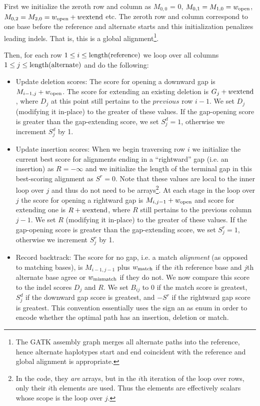 \documentclass[nofootinbib,amssymb,amsmath]{revtex4}
\begin{document}
First we initialize the zeroth row and column as $M_{0,0}$ = 0, $M_{0,1} = M_{1,0} = w_{\rm open}$, $M_{0,2} = M_{2,0} = w_{\rm open} + w{\rm extend}$ etc.  The zeroth row and column correspond to one base before the reference and alternate starts and this initialization penalizes leading indels.  That is, this is a global alignment\footnote{The GATK assembly graph merges all alternate paths into the reference, hence alternate haplotypes start and end coincident with the reference and global alignment is appropriate.}.

Then, for each row $1 \le i \le {\rm length(reference)}$ we loop over all columns $1 \le j \le {\rm length(alternate)}$ and do the following:

\begin{itemize}
\item Update deletion scores:  The score for opening a downward gap is $M_{i-1,j} + w_{\rm open}$.  The score for extending an existing deletion is $G_j + w{\rm extend}$, where $D_j$ at this point still pertains to the $previous$ row $i - 1$.  We set $D_j$ (modifying it in-place) to the greater of these values. If the gap-opening score is greater than the gap-extending score, we set $S^d_j = 1$, otherwise we increment $S^d_j$ by 1.
\item Update insertion scores:  When we begin traversing row $i$ we initialize the current best score for alignments ending in a ``rightward'' gap (i.e. an insertion) as $R = -\infty$ and we initialize the length of the terminal gap in this best-scoring alignment as $S^r = 0$.  Note that these values are local to the inner loop over $j$ and thus do not need to be arrays\footnote{In the code, they \textit{are} arrays, but in the $i$th iteration of the loop over rows, only their $i$th elements are used.  Thus the elements are effectively scalars whose scope is the loop over $j$.}.  At each stage in the loop over $j$ the score for opening a rightward gap is $M_{i,j - 1} + w_{\rm open}$ and score for extending one is $R + w{\rm extend}$, where $R$ still pertains to the previous column $j - 1$.  We set $R$ (modifying it in-place)  to the greater of these values.  If the gap-opening score is greater than the gap-extending score, we set $S^r_j = 1$, otherwise we increment $S^r_j$ by 1.
\item Record backtrack: The score for no gap, i.e. a match \textit{alignment} (as opposed to matching bases), is $M_{i-1,j-1}$ plus $w_{\rm match}$ if the $i$th reference base and $j$th alternate base agree or $w_{\rm mismatch}$ if they do not.  We now compare this score to the indel scores $D_j$ and $R$.  We set $B_{ij}$ to 0 if the match score is greatest, $S^d_j$ if the downward gap score is greatest, and $-S^r$ if the rightward gap score is greatest.  This convention essentially uses the sign an as enum in order to encode whether the optimal path has an insertion, deletion or match.
\end{itemize}
\end{document}
